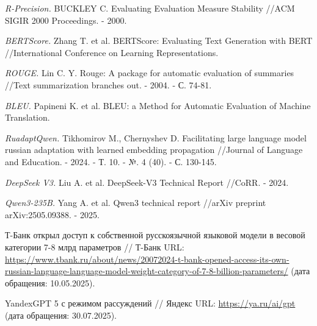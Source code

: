 \documentclass{article}
\begin{document}
\begin{thebibliography}{99}
\textit{R-Precision.}
BUCKLEY C. Evaluating Evaluation Measure Stability //ACM SIGIR 2000 Proceedings. - 2000.

\textit{BERTScore.}
Zhang T. et al. BERTScore: Evaluating Text Generation with BERT //International Conference on Learning Representations.

\textit{ROUGE.}
Lin C. Y. Rouge: A package for automatic evaluation of summaries //Text summarization branches out. - 2004. - С. 74-81.

\textit{BLEU.}
Papineni K. et al. BLEU: a Method for Automatic Evaluation of Machine Translation.

\textit{RuadaptQwen.}
Tikhomirov M., Chernyshev D. Facilitating large language model russian adaptation with learned embedding propagation //Journal of Language and Education. - 2024. - Т. 10. - №. 4 (40). - С. 130-145.

\textit{DeepSeek V3.}
Liu A. et al. DeepSeek-V3 Technical Report //CoRR. - 2024.

\textit{Qwen3-\allowbreak 235B.}
Yang A. et al. Qwen3 technical report //arXiv preprint arXiv:2505.09388. - 2025.

Т-Банк открыл доступ к собственной русскоязычной языковой модели в весовой категории 7-8 млрд параметров // Т-Банк URL: \url{https://www.tbank.ru/about/news/20072024-t-bank-opened-access-its-own-russian-language-language-model-weight-category-of-7-8-billion-parameters/} (дата обращения: 10.05.2025).

YandexGPT 5 с режимом рассуждений // Яндекс URL: \url{https://ya.ru/ai/gpt} (дата обращения: 30.07.2025).

\end{thebibliography}
\end{document}
